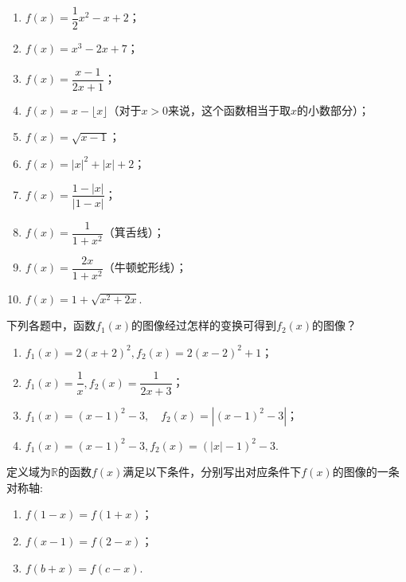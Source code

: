 \documentclass[lang=cn,math=cm,chinesefont=nofont,11pt,scheme=chinese,twocol]{elegantbook}
\begin{document}
\begin{spacing}{1.8}
  \begin{enumerate}\label{exer:FunctionGraph}
    \item $f(x)=\dfrac12 x^2-x+2$；
    \item $f(x)=x^3-2x+7$；
    \item $f(x)=\dfrac{x-1}{2x+1}$；
    \item $f(x)=x-\lfloor x\rfloor$（对于$x>0$来说，这个函数相当于取$x$的小数部分）；
    \item $f(x)=\sqrt{x-1}$；
    \item $f(x)=\left|x\right|^2+\left|x\right|+2$；
    \item $f(x)=\dfrac{1-\left|x\right|}{\left|1-x\right|}$；
    \item $f(x)=\dfrac{1}{1+x^2}$（箕舌线）；
    \item $f(x)=\dfrac{2x}{1+x^2}$（牛顿蛇形线）；
    \item $f(x)=1+\sqrt{x^{2}+2x}$.
  \end{enumerate}
\end{spacing}

\begin{exercise}\label{BJSZ.Algebra1.P58-59.changed}
  下列各题中，函数$f_1(x)$的图像经过怎样的变换可得到$f_2(x)$的图像？
\end{exercise}

\begin{spacing}{1.7}
  \begin{enumerate}
    \item $f_{1}(x)=2(x+2)^{2}, f_{2}(x)=2(x-2)^{2}+1$；
    \item $f_{1}(x)=\dfrac{1}{x}, f_{2}(x)=\dfrac{1}{2x+3}$；
    \item $f_{1}\left(x\right)=\left(x-1\right)^{2}-3,\quad f_{2}\left(x\right)=\left|\left(x-1\right)^{2}-3\right|$；
    \item $f_{1}(x)=(x-1)^{2}-3,f_{2}(x)=(|x|-1)^{2}-3$.
  \end{enumerate}
\end{spacing}

\begin{exercise}
  定义域为$\mathbb{R}$的函数$f(x)$满足以下条件，分别写出对应条件下$f(x)$的图像的一条对称轴:
\end{exercise}

\begin{enumerate}
  \item $f(1-x)=f(1+x)$；
  \item $f(x-1)=f(2-x)$；
  \item $f(b+x)=f(c-x)$.
\end{enumerate}
\end{document}
